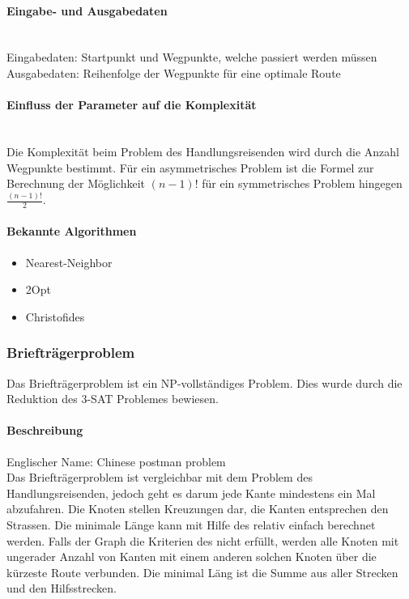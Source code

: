 	\paragraph{Eingabe- und Ausgabedaten}\mbox{}\\
	Eingabedaten: Startpunkt und Wegpunkte, welche passiert werden müssen\\
	Ausgabedaten: Reihenfolge der Wegpunkte für eine optimale Route

	\paragraph{Einfluss der Parameter auf die Komplexität}\mbox{}\\
	Die Komplexität beim Problem des Handlungsreisenden wird durch die Anzahl Wegpunkte bestimmt. Für ein asymmetrisches Problem ist die Formel zur Berechnung der Möglichkeit $(n-1)!$ 
	für ein symmetrisches Problem hingegen $\frac{(n-1)!}{2}$.
	
	 \newpage
	\paragraph{Bekannte Algorithmen}\cite{tsp_algorithmen} \cite{tsp_semesterarbeit}
	\begin{itemize}
		\item Nearest-Neighbor
		\item 2Opt
		\item Christofides
	\end{itemize}

	\subsubsection{Briefträgerproblem}\label{chinese_postman}
	Das Briefträgerproblem ist ein NP-vollständiges Problem. Dies wurde durch die Reduktion des 3-SAT Problemes bewiesen.

	\paragraph{Beschreibung}
	Englischer Name: Chinese postman problem\\
	Das Briefträgerproblem ist vergleichbar mit dem Problem des Handlungsreisenden, jedoch geht es darum jede Kante mindestens ein Mal abzufahren. Die Knoten stellen Kreuzungen dar, die 
	Kanten entsprechen den Strassen. Die minimale Länge kann mit Hilfe des  relativ einfach berechnet werden. Falls der Graph die Kriterien des 
	 nicht erfüllt, werden alle Knoten mit ungerader Anzahl von Kanten mit einem anderen solchen Knoten über die kürzeste Route verbunden. 
	Die minimal Läng ist die Summe aus aller Strecken und den Hilfsstrecken.
	\cite{pearson2004decision}

